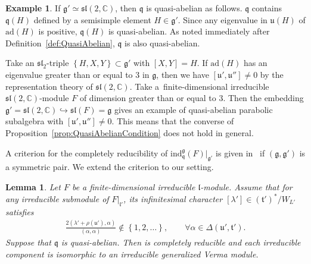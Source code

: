 \documentclass[pdftex]{sigma}
\numberwithin{equation}{section}
\newtheorem{Lemma}[Theorem]{Lemma}
\theoremstyle{definition}
\newtheorem{Example}[Theorem]{Example}
\newcommand{\set}[1]{\left\{#1 \right\}}
\newcommand{\BasicRing}[1]{\mathbb{#1}}
\newcommand{\CC}{\BasicRing{C}}
\newcommand{\ad}{\mathrm{ad}}
\newcommand{\lieC}[1]{\mathfrak{#1}}
\newcommand{\lie}[1]{\mathfrak{#1}}
\newcommand{\ind}[2]{\mathrm{ind}^{\lieC{#1}}_{\lieC{#2}}}
\begin{document}
\begin{Example}
	If $\lie{g'} \simeq \lie{sl}(2,\CC)$, then $\lie{q}$ is quasi-abelian as follows.
	$\lie{q}$ contains $\lie{q}(H)$ defined by a semisimple element $H\in \lie{g'}$.
	Since any eigenvalue in $\lie{u}(H)$ of $\ad(H)$ is positive, $\lie{q}(H)$ is quasi-abelian.
	As noted immediately after Definition~\ref{def:QuasiAbelian}, $\lie{q}$ is also quasi-abelian.

	Take an $\lie{sl}_2$-triple $\set{H, X, Y}\subset \lie{g'}$ with $[X, Y] = H$.
	If $\ad(H)$ has an eigenvalue greater than or equal to $3$ in $\lie{g}$, then we have $[\lie{u'}, \lie{u}''] \neq 0$
	by the representation theory of $\lie{sl}(2,\CC)$.
	Take a~finite-dimensional irreducible $\lie{sl}(2,\CC)$-module $F$ of dimension greater than or equal to $3$.
	Then the embedding $\lie{g'} = \lie{sl}(2,\CC) \hookrightarrow \lie{sl}(F) = \lie{g}$ gives an example
	of quasi-abelian parabolic subalgebra with $[\lie{u'}, \lie{u''}] \neq 0$.
	This means that the converse of Proposition~\ref{prop:QuasiAbelianCondition} does not hold in general.
\end{Example}


A criterion for the completely reducibility of $\ind{g}{q}(F)|_{\lie{g'}}$ is given in~\cite[Lemma~3.1]{EnPaWaWo85} if $(\lie{g}, \lie{g'})$ is a symmetric pair.
We extend the criterion to our setting.

\begin{Lemma}\label{lem:QuasiAbelianCompletelyReducible}
	Let $F$ be a finite-dimensional irreducible $\lie{l}$-module.
	Assume that for any irreducible submodule of $F|_{\lie{l}'}$, its infinitesimal character $[\lambda'] \in (\lie{t'})^*/W_{L'}$ satisfies
	\begin{align*}
		\frac{2(\lambda'+\rho(\lie{u}'), \alpha)}{(\alpha, \alpha)} \not \in \set{1, 2, \ldots}, \qquad \forall \alpha \in \Delta(\lie{u'}, \lie{t'}).
	\end{align*}
	Suppose that $\lie{q}$ is quasi-abelian.
	Then \smash{$\ind{g}{q}(F)|_{\lie{g}'}$} is completely reducible and each irreducible component is isomorphic to an irreducible generalized Verma module.
\end{Lemma}
\end{document}
